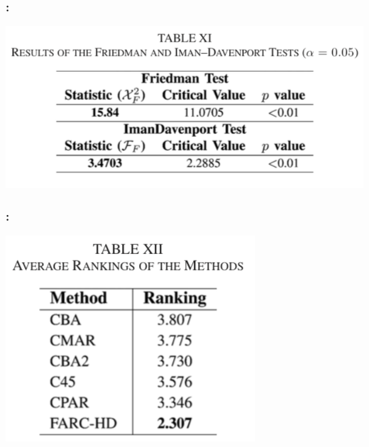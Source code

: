\documentclass{beamer}
\begin{document}
\begin{CJK*}{UTF8}{bsmi}

\begin{frame}
	\frametitle{\insertsection : \insertsubsection}
	\begin{center}
		\includegraphics[width=1\textheight]{./19.png}
	\end{center}
\end{frame}


\begin{frame}
	\frametitle{\insertsection : \insertsubsection}
	\begin{center}
		\includegraphics[width=1\textheight]{./20.png}
	\end{center}
\end{frame}



\end{CJK*}
\end{document}
